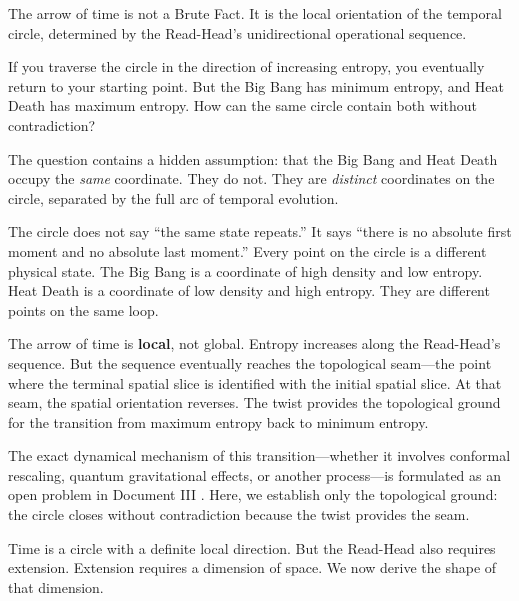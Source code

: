 \documentclass[11pt]{article}
\theoremstyle{canonstyle}
\begin{document}
\begin{keyresult}
The arrow of time is not a Brute Fact. It is the local orientation of the temporal circle, determined by the Read-Head's unidirectional operational sequence.
\end{keyresult}

\begin{reflect}
If you traverse the circle in the direction of increasing entropy, you eventually return to your starting point. But the Big Bang has minimum entropy, and Heat Death has maximum entropy. How can the same circle contain both without contradiction?
\end{reflect}

The question contains a hidden assumption: that the Big Bang and Heat Death occupy the \emph{same} coordinate. They do not. They are \emph{distinct} coordinates on the circle, separated by the full arc of temporal evolution.

The circle does not say ``the same state repeats.'' It says ``there is no absolute first moment and no absolute last moment.'' Every point on the circle is a different physical state. The Big Bang is a coordinate of high density and low entropy. Heat Death is a coordinate of low density and high entropy. They are different points on the same loop.

The arrow of time is \textbf{local}, not global. Entropy increases along the Read-Head's sequence. But the sequence eventually reaches the topological seam---the point where the terminal spatial slice is identified with the initial spatial slice. At that seam, the spatial orientation reverses. The twist provides the topological ground for the transition from maximum entropy back to minimum entropy.

The exact dynamical mechanism of this transition---whether it involves conformal rescaling, quantum gravitational effects, or another process---is formulated as an open problem in Document III \cite{CanonHow}. Here, we establish only the topological ground: the circle closes without contradiction because the twist provides the seam.

Time is a circle with a definite local direction. But the Read-Head also requires extension. Extension requires a dimension of space. We now derive the shape of that dimension.

\bigskip
\end{document}

